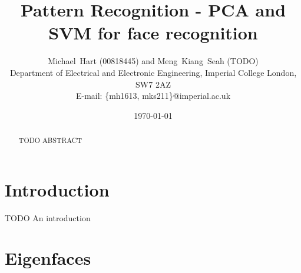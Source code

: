 \documentclass[a4paper, 10pt, conference]{ieeeconf}
\begin{document}
\title{Pattern Recognition - PCA and SVM for face recognition}
\author{Michael~Hart (00818445) and
        Meng~Kiang~Seah (TODO)
\\
        Department of Electrical and Electronic Engineering, 
        Imperial College London, 
        SW7 2AZ
 \\      
        E-mail: \{mh1613, mks211\}@imperial.ac.uk}
\date{\today}




\maketitle


\begin{abstract}
TODO ABSTRACT
\end{abstract}

\section{Introduction}

% 

TODO An introduction

\section{Eigenfaces}
\end{document}
